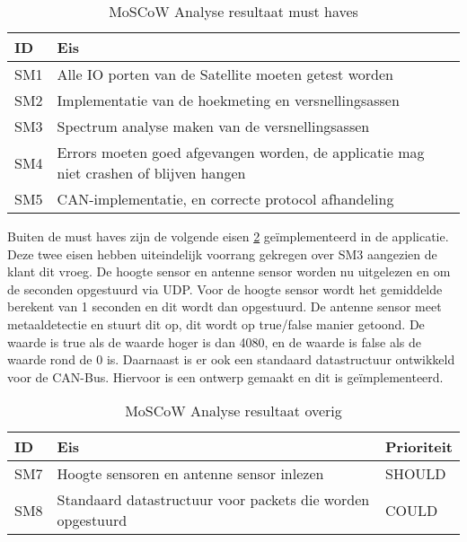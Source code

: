 \begin{table}[h!]
	\centering
	\caption{MoSCoW Analyse resultaat must haves}
	\label{tab:must}
	\begin{tabular}{lp{15cm}}
	\toprule
	\textbf{ID} & \textbf{Eis} \\ \midrule
	SM1			& Alle IO porten van de Satellite moeten getest worden 										\\
	SM2			& Implementatie van de hoekmeting en versnellingsassen 										\\ 
	SM3			& Spectrum analyse maken van de versnellingsassen 											\\ 
	SM4			& Errors moeten goed afgevangen worden, de applicatie mag niet crashen of blijven hangen 	\\ 
	SM5			& CAN-implementatie, en correcte protocol afhandeling										\\ \bottomrule
	\end{tabular}
\end{table}

\noindent Buiten de must haves zijn de volgende eisen \ref{tab:shouldetc} geïmplementeerd in de applicatie. Deze twee eisen hebben uiteindelijk voorrang gekregen over SM3 aangezien de klant dit vroeg. De hoogte sensor en antenne sensor worden nu uitgelezen en om de seconden opgestuurd via UDP. Voor de hoogte sensor wordt het gemiddelde berekent van 1 seconden en dit wordt dan opgestuurd. De antenne sensor meet metaaldetectie en stuurt dit op, dit wordt op true/false manier getoond. De waarde is true als de waarde hoger is dan 4080, en de waarde is false als de waarde rond de 0 is. Daarnaast is er ook een standaard datastructuur ontwikkeld voor de CAN-Bus. Hiervoor is een ontwerp gemaakt en dit is geïmplementeerd. 

\begin{table}[h!]

\centering
	\caption{MoSCoW Analyse resultaat overig}
	\label{tab:shouldetc}
	\begin{tabular}{lp{13cm}l}
	\toprule
	\textbf{ID} & \textbf{Eis} & \textbf{Prioriteit}\\ \midrule
	SM7			& Hoogte sensoren en antenne sensor inlezen 				 & SHOULD \\  \midrule
	SM8			& Standaard datastructuur voor packets die worden opgestuurd & COULD	 \\\bottomrule
	\end{tabular}
\end{table}


